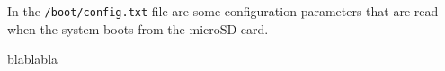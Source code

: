 In the \verb|/boot/config.txt| file are some configuration parameters that are read when the system boots from the microSD card.

blablabla